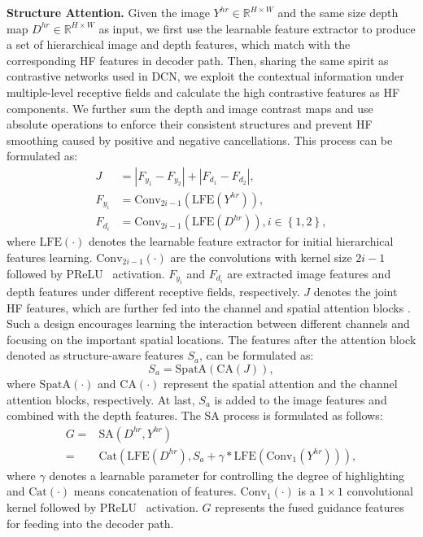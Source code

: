 \documentclass[letterpaper]{article} %
\begin{document}
\textbf{Structure Attention.}
Given the image $Y^{hr}\in \mathbb{R}^{H\times W}$ and the same size depth map $D^{hr}\in \mathbb{R}^{H\times W}$ as input, we first use the learnable feature extractor to produce a set of hierarchical image and depth features, which match with the corresponding  HF features in decoder path. Then, sharing the same spirit as contrastive networks used in DCN, we exploit the contextual information under multiple-level receptive fields and calculate the high contrastive features as HF components. We further sum the depth and image contrast maps and use absolute operations to enforce their consistent structures and prevent HF smoothing caused by positive and negative cancellations. This process can be formulated as:
\begin{align}
J&=|F_{y_{1}}-F_{y_{2}}| + |F_{d_{1}}-F_{d_{2}}|, \\
F_{y_{i}}&=\text{Conv}_{2i-1}(\text{LFE}(Y^{hr})),\\
F_{d_{i}}&=\text{Conv}_{2i-1}(\text{LFE}(D^{hr})), i\in\left\{1,2\right\},
\end{align}
where $\text{LFE}(\cdot)$ denotes the learnable feature extractor for initial hierarchical features learning. $\text{Conv}_{2i-1}(\cdot)$ are the convolutions with kernel size $2i-1$ followed by PReLU~\cite{he2015delving} activation. $F_{y_{i}}$ and $F_{d_{i}}$ are extracted image features and depth features under different receptive fields, respectively. $J$ denotes the joint HF features, which are further fed into the channel and spatial attention blocks \cite{woo2018cbam}. Such a design encourages learning the interaction between different channels and focusing on the important spatial locations. The features after the attention block denoted as structure-aware features $S_{a}$, can be formulated as:
\begin{equation}
S_{a}=\text{SpatA}(\text{CA}(J)),
\end{equation}
where $\text{SpatA}(\cdot)$ and $\text{CA}(\cdot)$ represent the spatial attention and the channel attention blocks, respectively. At last, $S_{a}$ is added to the image features and combined with the depth features. The SA process is formulated as follows:
\begin{align}
G=&\text{SA}(D^{hr},Y^{hr}) \nonumber \\
=&\text{Cat}(\text{LFE}(D^{hr}), S_{a}+\gamma*\text{LFE}(\text{Conv}_{1}(Y^{hr}))),
\label{eq:fy}
\end{align}
where $\gamma$ denotes a learnable parameter for controlling the degree of highlighting and $\text{Cat}(\cdot)$ means concatenation of features. $\text{Conv}_{1}(\cdot)$ is a $1\times1$ convolutional kernel followed by PReLU~\cite{he2015delving} activation. $G$ represents the fused guidance features for feeding into the decoder path.
\end{document}
